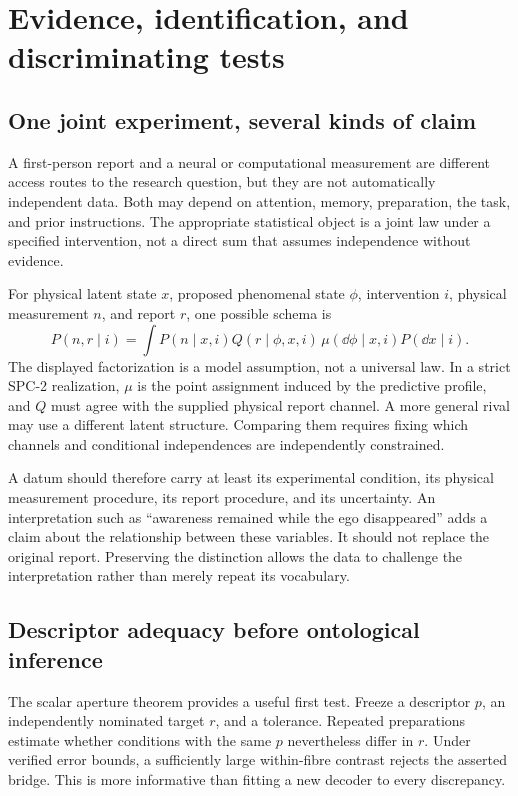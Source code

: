 \chapter{Evidence, identification, and discriminating tests}\label{ch:evidence}
\section{One joint experiment, several kinds of claim}\label{section:evidence:one-joint-experiment-several-kinds-of-claim}
A first-person report and a neural or computational measurement are different access routes to the research question, but they are not automatically independent data. Both may depend on attention, memory, preparation, the task, and prior instructions. The appropriate statistical object is a joint law under a specified intervention, not a direct sum that assumes independence without evidence.

For physical latent state $x$, proposed phenomenal state $\phi$, intervention $i$, physical measurement $n$, and report $r$, one possible schema is
\begin{equation}\label{eq:jointdata}
P(n,r\mid i)=\int P(n\mid x,i)Q(r\mid\phi,x,i)
\,\mu(\dd\phi\mid x,i)P(\dd x\mid i).
\end{equation}
The displayed factorization is a model assumption, not a universal law. In a strict SPC-2 realization, $\mu$ is the point assignment induced by the predictive profile, and $Q$ must agree with the supplied physical report channel. A more general rival may use a different latent structure. Comparing them requires fixing which channels and conditional independences are independently constrained.

A datum should therefore carry at least its experimental condition, its physical measurement procedure, its report procedure, and its uncertainty. An interpretation such as ``awareness remained while the ego disappeared'' adds a claim about the relationship between these variables. It should not replace the original report. Preserving the distinction allows the data to challenge the interpretation rather than merely repeat its vocabulary.

\section{Descriptor adequacy before ontological inference}\label{section:evidence:descriptor-adequacy-before-ontological-inference}
The scalar aperture theorem provides a useful first test. Freeze a descriptor $p$, an independently nominated target $r$, and a tolerance. Repeated preparations estimate whether conditions with the same $p$ nevertheless differ in $r$. Under verified error bounds, a sufficiently large within-fibre contrast rejects the asserted bridge. This is more informative than fitting a new decoder to every discrepancy.

